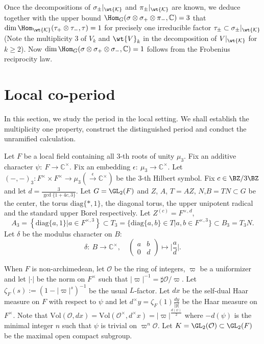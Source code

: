 \documentclass[11pt,reqno]{amsart}
\newcommand{\BC}{{\mathbb {C}}} \newcommand{\BD}{{\mathbb {D}}}
\newcommand{\CK}{{\mathcal {K}}} \newcommand{\CL}{{\mathcal {L}}}
\newcommand{\CO}{{\mathcal {O}}} \newcommand{\CP}{{\mathcal {P}}}
\newcommand{\diag}{{\mathrm{diag}}}
\newcommand{\Vol}{{\mathrm{Vol}}}\newcommand{\vol}{{\mathrm{vol}}}
\newcommand{\lra}{\longrightarrow}\newcommand{\lla}{\longleftarrow}
\theoremstyle{plain}
\theoremstyle{remark} \newtheorem{remark}[thm]{Remark}
\theoremstyle{definition} \newtheorem{exercise}[thm]{Exercise}
\theoremstyle{definition} \newtheorem{example}[thm]{Example} \newtheorem{condition}[thm]{Condition}
\numberwithin{equation}{section}
\renewcommand{\-}{\text{--}}
\begin{document}
Once the decompositions of $\sigma_\pm|_{\wt{\CK}}$ and $\pi_\pm|_{\wt{\CK}}$ are known,  we deduce together with the upper bound $\Hom_{G}(\sigma\otimes\sigma_+\otimes\pi_-,\BC)=3$
that $\dim \Hom_{\wt{\CK}}(\tau_+\otimes\tau_-,\tau)=1$
for precisely one irreducible factor $\tau_{\pm}\subset \sigma_{\pm}|_{\wt{\CK}}$ (Note the multiplicity $3$ of $V_k$ and $\wt{V}_k$ in the decomposition of $V|_{\wt{\CK}}$ for $k\geq2$).
Now   $\dim \Hom_{G}(\sigma\otimes\sigma_+\otimes\sigma_-,\BC)=1$ follows from the Frobenius reciprocity law.





\section{Local co-period}
In this section, we study the   period in the local setting. We shall establish the multiplicity one property, construct the distinguished   period and conduct the unramified calculation. 

Let  $F$ be a local field containing all $3$-th roots of unity $\mu_3$. Fix an additive character $\psi:\ F\to\BC^\times$. Fix an embedding $\epsilon:\ \mu_3\to\BC^\times$. Let  $(-,-)_3: F^\times\times F^\times\to\mu_3(\xrightarrow{\epsilon}\BC^\times)$ be the $3$-th Hilbert symbol. Fix $c\in\BZ/3\BZ$ and let $d=\frac{3}{\gcd\{1+4c,3\}}$. Let  $G=\GL_2(F)$ and $Z$, $A$, $T=AZ$, $N$,$B=TN\subset G$ be the center, the torus $\diag\{*,1\}$, the diagonal torus, the upper unipotent radical and  the standard upper Borel  respectively. Let $Z^{(c)}=F^{\times,d}$, \[A_3=
\left\{\diag\{a,1\}|a\in F^{\times,3}\right\}\subset T_3=\{\diag\{a,b\}\in T| a,b\in F^{\times,3}\}\subset B_3=T_3N.\]
Let $\delta$ be the modulus character on $B$:  \[\delta:\ B\lra\BC^\times,\quad \begin{pmatrix}a & b \\ 0 & d\end{pmatrix}\mapsto \Big|\frac{a}{d}\Big|.\]

When $F$ is non-archimedean, let $\CO$ be the ring of integers, $\varpi$ be a uniformizer and let  $|\cdot|$ be the norm on $F^\times$ such that $|\varpi|^{-1}=\sharp\CO/\varpi$. Let $\zeta_F(s):=(1-|\varpi|^s)^{-1}$ be the usual $L$-factor. Let $dx$  be the self-dual Haar measure on $F$  with respect to $\psi$ and let $d^\times y=\zeta_F(1)\frac{dy}{|y|}$ be the Haar measure on $F^\times$. Note that $\Vol(\CO,dx)=\Vol(\CO^\times,d^\times x)=|\varpi|^{\frac{d(\psi)}{2}}$ where $-d(\psi)$ is the minimal integer $n$ such that $\psi$ is trivial on $\varpi^n\CO$.  Let $K=\GL_2(\CO)\subset \GL_2(F)$ be the maximal open compact subgroup. 
\end{document}
